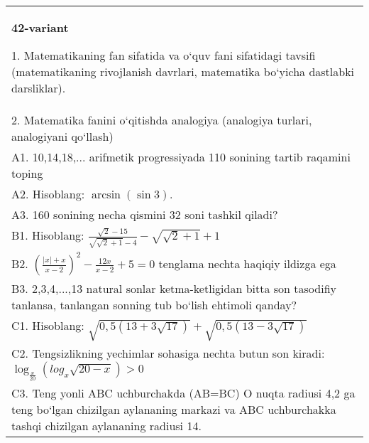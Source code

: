 \documentclass{article}
\begin{document}
\begin{tabular}{m{17cm}}
\textbf{42-variant}

1. Matematikaning fan sifatida va o‘quv fani sifatidagi tavsifi (matematikaning rivojlanish davrlari, matematika bo‘yicha dastlabki darsliklar). \\
2. Matematika fanini o‘qitishda analogiya (analogiya turlari, analogiyani qo‘llash) \\
A1. 10,14,18,... arifmetik progressiyada 110 sonining tartib raqamini toping \\
A2. Hisoblang: \(\arcsin (\sin3) \). \\
A3. 160 sonining necha qismini 32 soni tashkil qiladi? \\
B1. Hisoblang: \(\frac{\sqrt{2} - 15}{\sqrt{\sqrt{2} + 1} - 4} - \sqrt{\sqrt{2} + 1} + 1\) \\
B2. $ (\frac{|x| + x}{x-2}) ^{2} - \frac{12x}{x-2} + 5 = 0$ tenglama nechta haqiqiy ildizga ega \\
B3. 2,3,4,...,13 natural sonlar ketma-ketligidan bitta son tasodifiy tanlansa, tanlangan sonning tub bo‘lish ehtimoli qanday? \\
C1. Hisoblang: \(\sqrt{0,5 (13 + 3\sqrt{17}) } + \sqrt{0,5 (13 - 3\sqrt{17}) }\) \\
C2. Tengsizlikning yechimlar sohasiga nechta butun son kiradi: \(\log_{\frac{x}{20}} (log_{x}\sqrt{20 - x}) > 0\) \\
C3. Teng yonli ABC uchburchakda (AB=BC) O nuqta radiusi 4,2 ga teng bo‘lgan chizilgan aylananing markazi va ABC uchburchakka tashqi chizilgan aylananing radiusi 14. \\

\end{tabular}
\vspace{1cm}
\end{document}
